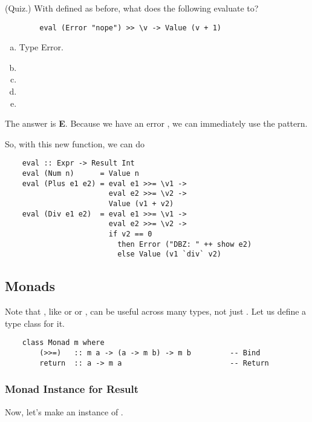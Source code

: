 \documentclass[letterpaper]{article}
\begin{document}
\begin{mdframed}[]
    (Quiz.) With \code{>>=} defined as before, what does the following evaluate to? 
    \begin{verbatim}
        eval (Error "nope") >> \v -> Value (v + 1)\end{verbatim}
    \begin{enumerate}[(a)]
        \item Type Error. 
        \item {}
        \item {}
        \item {}
        \item {}
    \end{enumerate}
    
    \begin{mdframed}[]
        The answer is \textbf{E}. Because we have an error , we can immediately use the  pattern.
    \end{mdframed}
\end{mdframed}
So, with this new function, we can do 
\begin{verbatim}
    eval :: Expr -> Result Int
    eval (Num n)      = Value n
    eval (Plus e1 e2) = eval e1 >>= \v1 ->
                        eval e2 >>= \v2 ->
                        Value (v1 + v2)
    eval (Div e1 e2)  = eval e1 >>= \v1 ->
                        eval e2 >>= \v2 ->
                        if v2 == 0
                          then Error ("DBZ: " ++ show e2)
                          else Value (v1 `div` v2)\end{verbatim}

\subsection{Monads}
Note that \code{>>=}, like  or  or \code{==}, can be useful across many types, not just . Let us define a type class for it. 

\begin{verbatim}
    class Monad m where 
        (>>=)   :: m a -> (a -> m b) -> m b         -- Bind 
        return  :: a -> m a                         -- Return \end{verbatim}

\subsubsection{Monad Instance for Result}
Now, let's make  an instance of .
\end{document}
